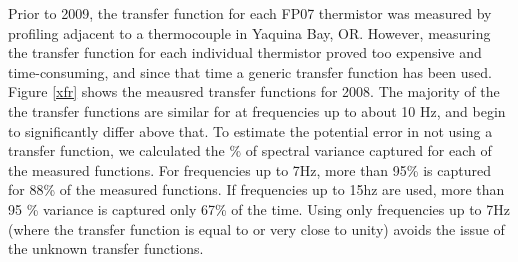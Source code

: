 \documentclass{ametsoc}
\begin{document}
Prior to 2009, the transfer function for each FP07 thermistor was measured by profiling adjacent to a thermocouple in Yaquina Bay, OR. However, measuring the transfer function for each individual thermistor proved too expensive and time-consuming, and since that time a generic transfer function has been used. Figure \ref{xfr} shows the meausred transfer functions for 2008. The majority of the the transfer functions are similar for at frequencies up to about 10 Hz, and begin to significantly differ above that. To estimate the potential error in not using a transfer function, we calculated the $\%$ of spectral variance captured for each of the measured functions. For frequencies up to 7Hz, more than 95\% is captured for 88\% of the measured functions. If frequencies up to 15hz are used, more than 95 \% variance is captured only 67\% of the time. Using only frequencies up to 7Hz (where the transfer function is equal to or very close to unity) avoids the issue of the unknown transfer functions.






%
%
%
 
 
\end{document}
